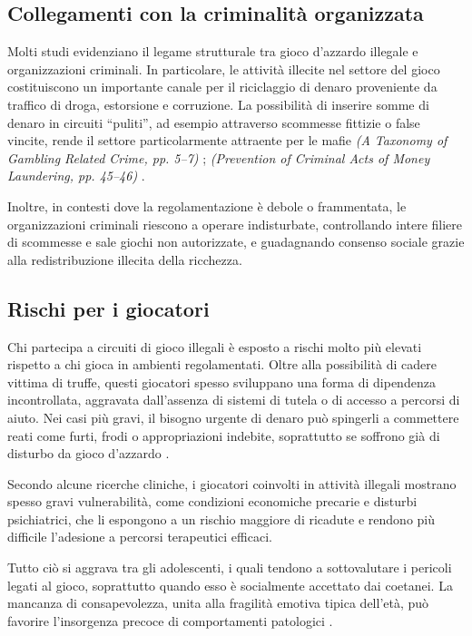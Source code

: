 \documentclass[a4paper,12pt]{article}
\begin{document}
\subsection{Collegamenti con la criminalità organizzata}

Molti studi evidenziano il legame strutturale tra gioco d’azzardo illegale e organizzazioni criminali. In particolare, le attività illecite nel settore del gioco costituiscono un importante canale per il riciclaggio di denaro proveniente da traffico di droga, estorsione e corruzione. La possibilità di inserire somme di denaro in circuiti “puliti”, ad esempio attraverso scommesse fittizie o false vincite, rende il settore particolarmente attraente per le mafie \textit{(A Taxonomy of Gambling Related Crime, pp. 5--7)} \cite{banks2018taxonomy}; \textit{(Prevention of Criminal Acts of Money Laundering, pp. 45--46)} \cite{tarina2019moneylaundering}.

Inoltre, in contesti dove la regolamentazione è debole o frammentata, le organizzazioni criminali riescono a operare indisturbate, controllando intere filiere di scommesse e sale giochi non autorizzate, e guadagnando consenso sociale grazie alla redistribuzione illecita della ricchezza.

\subsection{Rischi per i giocatori}

Chi partecipa a circuiti di gioco illegali è esposto a rischi molto più elevati rispetto a chi gioca in ambienti regolamentati. Oltre alla possibilità di cadere vittima di truffe, questi giocatori spesso sviluppano una forma di dipendenza incontrollata, aggravata dall’assenza di sistemi di tutela o di accesso a percorsi di aiuto. Nei casi più gravi, il bisogno urgente di denaro può spingerli a commettere reati come furti, frodi o appropriazioni indebite, soprattutto se soffrono già di disturbo da gioco d’azzardo \cite{gorsane2017illegalacts}.

Secondo alcune ricerche cliniche, i giocatori coinvolti in attività illegali mostrano spesso gravi vulnerabilità, come condizioni economiche precarie e disturbi psichiatrici, che li espongono a un rischio maggiore di ricadute e rendono più difficile l’adesione a percorsi terapeutici efficaci.

Tutto ciò si aggrava tra gli adolescenti, i quali tendono a sottovalutare i pericoli legati al gioco, soprattutto quando esso è socialmente accettato dai coetanei. La mancanza di consapevolezza, unita alla fragilità emotiva tipica dell’età, può favorire l’insorgenza precoce di comportamenti patologici \cite{ferrara2019childrenrisk}.
\end{document}
